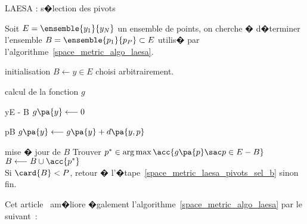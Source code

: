             \begin{xalgorithm}{LAESA : s�lection des pivots}
            \label{space_metric_algo_laesa_pivtos_sel}
            
            Soit $E = \ensemble{y_1}{y_N}$ un ensemble de points, on cherche � d�terminer 
            l'ensemble $B = \ensemble{p_1}{p_P} \subset E$ utilis� par l'algorithme~\ref{space_metric_algo_laesa}.
            
            \begin{xalgostep}{initialisation}
                $B \longleftarrow y \in E$ choisi arbitrairement.
            \end{xalgostep}
            
            \begin{xalgostep}{calcul de la fonction $g$} \label{space_metric_laesa_pivots_sel_b}
                    \begin{xforeach}{y}{E - B}
                        $g\pa{y} \longleftarrow 0$ \\
                        \begin{xforeach}{p}{B}
                        $g\pa{y} \longleftarrow g\pa{y} + d\pa{y,p}$
                        \end{xforeach}
                    \end{xforeach}
            \end{xalgostep}
            
            \begin{xalgostep}{mise � jour de $B$}
                    Trouver $p^* \in \arg \max \acc { g\pa{p} \sac p \in E - B}$\\
                    $B \longleftarrow B \cup \acc{ p^*}$ \\
                    Si $\card{B} < P$, retour � l'�tape~\ref{space_metric_laesa_pivots_sel_b} sinon fin.
            \end{xalgostep}
            
            \end{xalgorithm}




Cet article~ am�liore �galement l'algorithme~\ref{space_metric_algo_laesa} par le suivant~:



